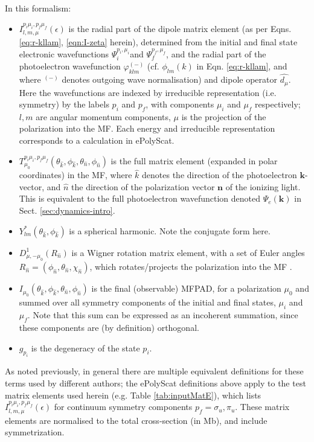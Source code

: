 \documentclass[10pt]{article}
\begin{document}
In this formalism:
\begin{itemize}
\item $I_{l,m,\mu}^{p_{i}\mu_{i},p_{f}\mu_{f}}(\epsilon)$ is the radial part of the dipole matrix element (as per Eqns. \ref{eq:r-kllam}, \ref{eqn:I-zeta} herein), determined from the initial and final state electronic wavefunctions $\Psi_{i}^{p_{i},\mu_{i}}$and $\Psi_{f}^{p_{f},\mu_{f}}$,
and the radial part of the photoelectron wavefunction $\varphi_{klm}^{(-)}$ (cf. $\phi_{lm}(k)$ in Eqn. \ref{eq:r-kllam}, and where $^{(-)}$ denotes outgoing wave normalisation) and dipole operator $\hat{d_{\mu}}$. Here the wavefunctions are indexed by irreducible representation (i.e. symmetry) by the labels $p_{i}$ and $p_{f}$, with components $\mu_{i}$ and $\mu_{f}$ respectively; $l,m$ are angular momentum components, $\mu$ is the projection of the polarization into the MF. Each energy and irreducible representation corresponds to a calculation in ePolyScat.
\item $T_{\mu_{0}}^{p_{i}\mu_{i},p_{f}\mu_{f}}(\theta_{\hat{k}},\phi_{\hat{k}},\theta_{\hat{n}},\phi_{\hat{n}})$
is the full matrix element (expanded in polar coordinates) in the
MF, where $\hat{k}$ denotes the direction of the photoelectron $\mathbf{k}$-vector, and $\hat{n}$ the direction of the polarization vector $\mathbf{n}$ of the ionizing light. This is equivalent to the full photoelectron wavefunction denoted $\Psi_e(\mathbf{k})$ in Sect. \ref{sec:dynamics-intro}.
\item $Y_{lm}^{*}(\theta_{\hat{k}},\phi_{\hat{k}})$ is a spherical harmonic. Note the conjugate form here.
\item $D_{\mu,-\mu_{0}}^{1}(R_{\hat{n}})$ is a Wigner rotation matrix element, with a set of Euler angles $R_{\hat{n}}=(\phi_{\hat{n}},\theta_{\hat{n}},\chi_{\hat{n}})$, which rotates/projects the polarization into the MF .
\item $I_{\mu_{0}}(\theta_{\hat{k}},\phi_{\hat{k}},\theta_{\hat{n}},\phi_{\hat{n}})$ is the final (observable) MFPAD, for a polarization $\mu_{0}$ and summed over all symmetry components of the initial and final states, $\mu_{i}$ and $\mu_{f}$. Note that this sum can be expressed as an incoherent summation, since these components are (by definition) orthogonal.
\item $g_{p_{i}}$ is the degeneracy of the state $p_{i}$.
\end{itemize}

As noted previously, in general there are multiple equivalent definitions for these terms used by different authors; the ePolyScat definitions above apply to the test matrix elements used herein (e.g. Table \ref{tab:inputMatE}), which lists $I_{l,m,\mu}^{p_{i}\mu_{i},p_{f}\mu_{f}}(\epsilon)$ for continuum symmetry components $p_f=\sigma_u,\pi_u$. These matrix elements are normalised to the total cross-section (in Mb), and include symmetrization. 
\end{document}
